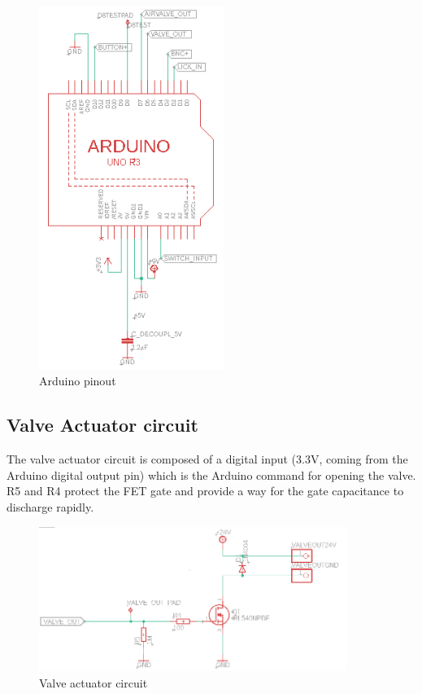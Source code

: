 \documentclass[a4paper]{article}
\begin{document}
\begin{figure}[h!]
    \centering
    \includegraphics[width = 6cm]{images/logical.PNG}
    \caption{Arduino pinout}
    \label{fig:logical}
\end{figure}

\subsection{Valve Actuator circuit}
\label{actuator}
The valve actuator circuit is composed of a digital input (3.3V, coming from the Arduino digital output pin) which is the Arduino command for opening the valve. R5 and R4 protect the FET gate and provide a way for the gate capacitance to discharge rapidly.

\begin{figure}[h!]
    \centering
    \includegraphics[width = 10cm]{images/actuator.PNG}
    \caption{Valve actuator circuit}
    \label{fig:actuator}
\end{figure}
\end{document}
